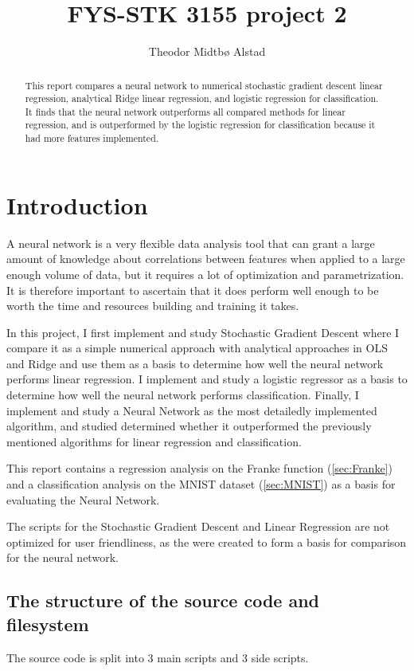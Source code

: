 \documentclass[a4paper, UKenglish]{article}
\newcommand{\0}{\mathbf{0}}
\newcommand{\1}{\mathbf{1}}
\begin{document}
\title{FYS-STK 3155 project 2}
\author{Theodor Midtbø Alstad}
\maketitle

\begin{abstract}
This report compares a neural network to numerical stochastic gradient descent linear regression, analytical Ridge linear regression, and logistic regression for classification. It finds that the neural network outperforms all compared methods for linear regression, and is outperformed by the logistic regression for classification because it had more features implemented.
\end{abstract}

\section{Introduction}
A neural network is a very flexible data analysis tool that can grant a large amount of knowledge about correlations between features when applied to a large enough volume of data, but it requires a lot of optimization and parametrization. It is therefore important to ascertain that it does perform well enough to be worth the time and resources building and training it takes.

In this project, I first implement and study Stochastic Gradient Descent where I compare it as a simple numerical approach with analytical approaches in OLS and Ridge and use them as a basis to determine how well the neural network performs linear regression. I implement and study a logistic regressor as a basis to determine how well the neural network performs classification. Finally, I implement and study a Neural Network as the most detailedly implemented algorithm, and studied determined whether it outperformed the previously mentioned algorithms for linear regression and classification.

This report contains a regression analysis on the Franke function (\autoref{sec:Franke}) and a classification analysis on the MNIST dataset (\autoref{sec:MNIST}) as a basis for evaluating the Neural Network.


The scripts for the Stochastic Gradient Descent and Linear Regression are not optimized for user friendliness, as the were created to form a basis for comparison for the neural network.

\subsection{The structure of the source code and filesystem}
The source code is split into 3 main scripts and 3 side scripts.
\end{document}
